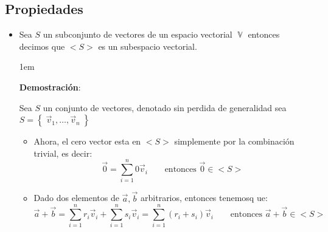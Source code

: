 \documentclass[12pt, fleqn]{report}                             %
\newenvironment{SmallIndentation}[1][0.75em]                    %
        {\begin{adjustwidth}{#1}{}\begin{footnotesize}}             %
        {\end{footnotesize}\end{adjustwidth}}                       %
\DeclareMathOperator \Space     {\quad}                         %
\theoremstyle{break}                                            %
\DeclareMathOperator \VectorSet    {\mathbb{V}}                 %
\newcommand{\Set}[1]            {\left\{ \; #1 \; \right\}}     %
\begin{document}
            \subsection{Propiedades}

                \begin{itemize}
                    \item 
                        Sea $S$ un subconjunto de vectores de un espacio vectorial $\VectorSet$ entonces
                        decimos que $<S>$ es un subespacio vectorial.

                        \begin{SmallIndentation}[1em]
                            \textbf{Demostración}:
                            
                            Sea $S$ un conjunto de vectores, denotado sin perdida de generalidad
                            sea $S = \Set{\vec v_1, \dots, \vec v_n}$

                            \begin{itemize}
                                \item
                                    Ahora, el cero vector esta en $<S>$ simplemente por la combinación
                                    trivial, es decir:
                                    \begin{equation*}
                                        \vec 0 = \sum_{i = 1}^n 0 \vec v_i
                                        \Space \text{ entonces } \vec 0 \in <S>
                                    \end{equation*}

                                \item
                                    Dado dos elementos de $\vec a, \vec b$ arbitrarios, entonces tenemosq ue:
                                    \begin{equation*}
                                        \vec a + \vec b 
                                            = \sum_{i = 1}^n r_i \vec v_i + \sum_{i = 1}^n s_i \vec v_i
                                            = \sum_{i = 1}^n (r_i + s_i) \vec v_i
                                            \Space \text{ entonces } \vec a + \vec b \in <S>
                                    \end{equation*}


\end{itemize}
\end{SmallIndentation}
\end{itemize}
\end{document}

